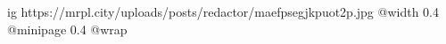  
 
 
 
 

\ifcmt
  ig https://mrpl.city/uploads/posts/redactor/maefpsegjkpuot2p.jpg
  @width 0.4
  @minipage 0.4
  @wrap \parpic[r]
\fi
